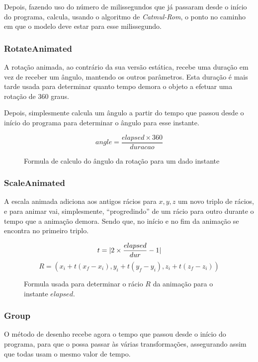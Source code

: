 \documentclass[a4paper]{article}
\newcommand{\x}{\times}
\begin{document}
Depois, fazendo uso do número de milissegundos que já passaram desde o início do programa, calcula, usando o algoritmo de \textit{Catmul-Rom}, o ponto no caminho em que o modelo deve estar para esse milissegundo.

\subsubsection{RotateAnimated}\label{sec:rotate}

A rotação animada, ao contrário da sua versão estática, recebe uma duração em vez de receber um ângulo, mantendo os outros parâmetros. Esta duração é mais tarde usada para determinar quanto tempo demora o objeto a efetuar uma rotação de 360\degree{} graus.

Depois, simplesmente calcula um ângulo a partir do tempo que passou desde o início do programa para determinar o ângulo para esse instante.

\begin{figure}[H]
    \[
        angle = \frac{elapsed \x 360}{duracao}
    \]
    \caption{Formula de calculo do ângulo da rotação para um dado instante}
\end{figure}

\subsubsection{ScaleAnimated}\label{sec:scale}

A escala animada adiciona aos antigos rácios para $x, y, z$ um novo triplo de rácios, e para animar vai, simplesmente, ``progredindo'' de um rácio para outro durante o tempo que a animação demora. Sendo que, no início e no fim da animação se encontra no primeiro triplo.

\begin{figure}[H]
    \[
        t = |2 \x \frac{elapsed}{dur} - 1|\\
    \]
    \[
        R = (x_i + t (x_f - x_i), y_i + t (y_f - y_i), z_i + t (z_f - z_i))
    \]
    \caption{Formula usada para determinar o rácio $R$ da animação para o instante $elapsed$.}
\end{figure}

\subsubsection{Group}

O método de desenho recebe agora o tempo que passou desde o início do programa, para que o possa passar às várias transformações, assegurando assim que todas usam o mesmo valor de tempo.
\end{document}
